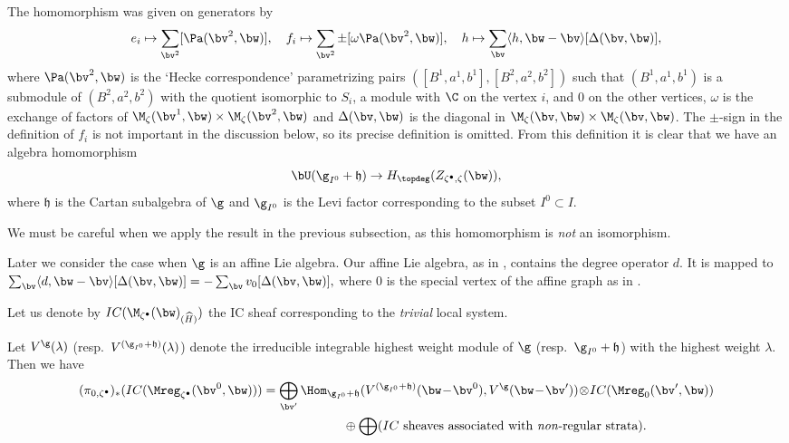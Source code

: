 The homomorphism was given on generators by
\begin{equation*}
   e_i \mapsto \sum_{\bv^2} [\Pa(\bv^2,\bw)],\quad
   f_i \mapsto \sum_{\bv^2} \pm [\omega\Pa(\bv^2,\bw)], \quad
   h \mapsto \sum_{\bv} \langle h, \bw - \bv\rangle [\Delta(\bv,\bw)],
\end{equation*}
where $\Pa(\bv^2,\bw)$ is the `Hecke correspondence' parametrizing
pairs $([B^1,a^1,b^1],[B^2,a^2,b^2])$ such that $(B^1,a^1,b^1)$ is a
submodule of $(B^2,a^2,b^2)$ with the quotient isomorphic to $S_i$, a
module with $\C$ on the vertex $i$, and $0$ on the other vertices,
$\omega$ is the exchange of factors of $\M_\zeta(\bv^1,\bw)\times
\M_\zeta(\bv^2,\bw)$ and $\Delta(\bv,\bw)$ is the diagonal in
$\M_\zeta(\bv,\bw)\times \M_\zeta(\bv,\bw)$. The $\pm$-sign in the
def\/inition of $f_i$ is not important in the discussion below, so its
precise def\/inition is omitted.
%
From this def\/inition it is clear that we have an algebra homomorphism
\begin{equation*}
   \bU(\g_{I^0}+\mathfrak h) \to H_{\topdeg}(Z_{\zeta^\bullet,\zeta}(\bw)),
\end{equation*}
where $\mathfrak h$ is the Cartan subalgebra of $\g$ and $\g_{I^0}$ is
the Levi factor corresponding to the subset $I^0\subset I$.

We must be careful when we apply the result in the previous
subsection, as this homomorphism is {\it not\/} an isomorphism.

\begin{Remark}\label{rem:degree}
  Later we consider the case when $\g$ is an af\/f\/ine Lie algebra. Our
  af\/f\/ine Lie algebra, as in \cite{Kac}, contains the degree operator
  $d$. It is mapped to
\(
   \sum_\bv \langle d, \bw - \bv\rangle [\Delta(\bv,\bw)]
   = - \sum_{\bv} v_0[\Delta(\bv,\bw)],
\)
where $0$ is the special vertex of the af\/f\/ine graph as in
.
\end{Remark}

Let us denote by $IC(\M_{\zeta^\bullet}(\bw)_{(\widehat H)})$ the IC
sheaf corresponding to the {\it trivial\/} local system.

\begin{Theorem}\label{thm:branch}
  Let $V^\g(\lambda)$ \textup(resp.\ $V^{(\g_{I^0}+\mathfrak
    h)}(\lambda)$\textup) denote the irreducible integrable highest
  weight module of $\g$ \textup(resp.\ $\g_{I^0}+\mathfrak h$\textup)
  with the highest weight $\lambda$. Then we have
  \begin{gather*}
    (\pi_{0,\zeta^\bullet})_*(IC(\Mreg_{\zeta^\bullet}(\bv^0,\bw)))
   =
    \bigoplus_{\bv'}
    \Hom_{\g_{I^0}+\mathfrak
    h}(V^{(\g_{I^0}+\mathfrak h)}(\bw \!-\! \bv^0), V^\g(\bw\!-\!\bv'))
  \!\otimes\! IC(\Mreg_0(\bv',\bw))
  \\
  \phantom{(\pi_{0,\zeta^\bullet})_*(IC(\Mreg_{\zeta^\bullet}(\bv^0,\bw)))=}{} \oplus
  \bigoplus (\text{\rm
    $IC$ sheaves associated with {\it non\/}-regular strata}).
  \end{gather*}
\end{Theorem}

